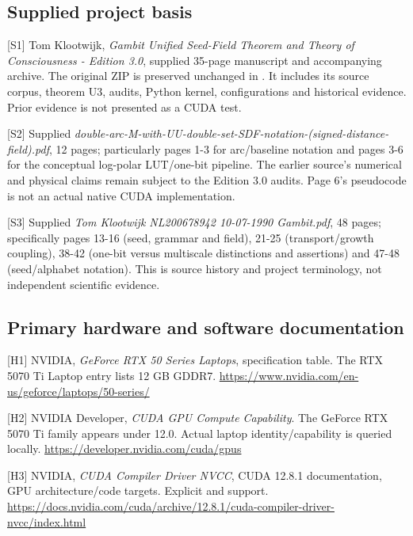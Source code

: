 \documentclass[11pt,a4paper]{article}
\begin{document}
\subsection{Supplied project basis}\label{supplied-project-basis}

{[}S1{]} Tom Klootwijk, \emph{Gambit Unified Seed-Field Theorem and Theory of Consciousness - Edition 3.0}, supplied 35-page manuscript and accompanying archive. The original ZIP is preserved unchanged in . It includes its source corpus, theorem U3, audits, Python kernel, configurations and historical evidence. Prior evidence is not presented as a CUDA test.

{[}S2{]} Supplied \emph{double-arc-M-with-UU-double-set-SDF-notation-(signed-distance-field).pdf}, 12 pages; particularly pages 1-3 for arc/baseline notation and pages 3-6 for the conceptual log-polar LUT/one-bit pipeline. The earlier source's numerical and physical claims remain subject to the Edition 3.0 audits. Page 6's pseudocode is not an actual native CUDA implementation.

{[}S3{]} Supplied \emph{Tom Klootwijk NL200678942 10-07-1990 Gambit.pdf}, 48 pages; specifically pages 13-16 (seed, grammar and field), 21-25 (transport/growth coupling), 38-42 (one-bit versus multiscale distinctions and assertions) and 47-48 (seed/alphabet notation). This is source history and project terminology, not independent scientific evidence.

\subsection{Primary hardware and software documentation}\label{primary-hardware-and-software-documentation}

{[}H1{]} NVIDIA, \emph{GeForce RTX 50 Series Laptops}, specification table. The RTX 5070 Ti Laptop entry lists 12 GB GDDR7. \url{https://www.nvidia.com/en-us/geforce/laptops/50-series/}

{[}H2{]} NVIDIA Developer, \emph{CUDA GPU Compute Capability}. The GeForce RTX 5070 Ti family appears under 12.0. Actual laptop identity/capability is queried locally. \url{https://developer.nvidia.com/cuda/gpus}

{[}H3{]} NVIDIA, \emph{CUDA Compiler Driver NVCC}, CUDA 12.8.1 documentation, GPU architecture/code targets. Explicit  and  support. \url{https://docs.nvidia.com/cuda/archive/12.8.1/cuda-compiler-driver-nvcc/index.html}
\end{document}
